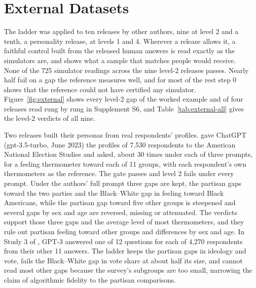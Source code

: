 
\section{External Datasets}
\label{sec:external}

The ladder was applied to ten releases by other authors, nine at level 2 and a tenth, a personality release, at levels 1 and 4. %
Wherever a release allows it, a faithful control built from the released human answers is read exactly as the simulators are, and shows what a sample that matches people would receive.
None of the 725 simulator readings across the nine level-2 releases passes. %
Nearly half fail on a gap the reference measures well, and for most of the rest step 0 shows that the reference could not have certified any simulator. %
Figure~\ref{fig:external} shows every level-2 gap of the worked example and of four releases read rung by rung in Supplement S6, and Table~\ref{tab:external-all} gives the level-2 verdicts of all nine.

Two releases built their personas from real respondents' profiles.
\citet{bisbee2024synthetic} gave ChatGPT (gpt-3.5-turbo, June 2023) the profiles of 7,530 respondents to the American National Election Studies and asked, about 30 times under each of three prompts, for a feeling thermometer toward each of 11 groups, with each respondent's own thermometers as the reference. %
The gate passes and level 2 fails under every prompt. %
Under the authors' full prompt three gaps are kept, the partisan gaps toward the two parties and the Black--White gap in feeling toward Black Americans, while the partisan gap toward five other groups is steepened and several gaps by sex and age are reversed, missing or attenuated. %
The verdicts support those three gaps and the average level of most thermometers, and they rule out partisan feeling toward other groups and differences by sex and age.
In Study 3 of \citet{argyle2023outofone}, GPT-3 answered one of 12 questions for each of 4,270 respondents from their other 11 answers. %
The ladder keeps the partisan gaps in ideology and vote, fails the Black--White gap in vote share at about half its size, and cannot read most other gaps because the survey's subgroups are too small, narrowing the claim of algorithmic fidelity to the partisan comparisons. %


